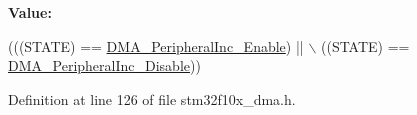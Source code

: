 {\bfseries Value\+:}
\begin{DoxyCode}
(((STATE) == \hyperlink{group___d_m_a__peripheral__incremented__mode_gaf7921ea423fb60701a091c508cd0f33a}{DMA\_PeripheralInc\_Enable}) || \(\backslash\)
                                            ((STATE) == 
      \hyperlink{group___d_m_a__peripheral__incremented__mode_ga0fe3ff9c67bec802dd239fd17c3dbd31}{DMA\_PeripheralInc\_Disable}))
\end{DoxyCode}


Definition at line 126 of file stm32f10x\+\_\+dma.\+h.

